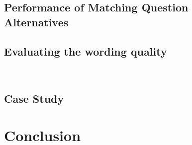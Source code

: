 \documentclass{llncs}
\begin{document}
\subsection{Performance of Matching Question Alternatives}

\subsection{Evaluating the wording quality}

~\cite{Trochim2000Research}

\subsection{Case Study}


\section{Conclusion}\label{sec:conclusion}
%

\end{document}

